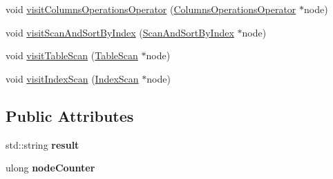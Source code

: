\begin{DoxyCompactItemize}
\item 
void \hyperlink{class_physical_operator_drawing_visitor_ad1fb3f6d50ba14ad674a71e5f6c35d12}{visit\+Columns\+Operations\+Operator} (\hyperlink{class_columns_operations_operator}{Columns\+Operations\+Operator} $\ast$node)
\item 
void \hyperlink{class_physical_operator_drawing_visitor_abf3323e213f5c7502e76b0d9afb9fe33}{visit\+Scan\+And\+Sort\+By\+Index} (\hyperlink{class_scan_and_sort_by_index}{Scan\+And\+Sort\+By\+Index} $\ast$node)
\item 
void \hyperlink{class_physical_operator_drawing_visitor_a709a44c2c02c9fc42d44fe3822c22f5b}{visit\+Table\+Scan} (\hyperlink{class_table_scan}{Table\+Scan} $\ast$node)
\item 
void \hyperlink{class_physical_operator_drawing_visitor_a3d8f7b6bff44d79fb741b2709587f867}{visit\+Index\+Scan} (\hyperlink{class_index_scan}{Index\+Scan} $\ast$node)
\end{DoxyCompactItemize}
\subsection*{Public Attributes}
\begin{DoxyCompactItemize}
\item 
\hypertarget{class_physical_operator_drawing_visitor_a5663f7f6a5c8a6ad25d0c4c8f918123e}{std\+::string {\bfseries result}}\label{class_physical_operator_drawing_visitor_a5663f7f6a5c8a6ad25d0c4c8f918123e}

\item 
\hypertarget{class_physical_operator_drawing_visitor_a75aa4987d070c40a3ec2e4e9c950c9e0}{ulong {\bfseries node\+Counter}}\label{class_physical_operator_drawing_visitor_a75aa4987d070c40a3ec2e4e9c950c9e0}

\end{DoxyCompactItemize}


